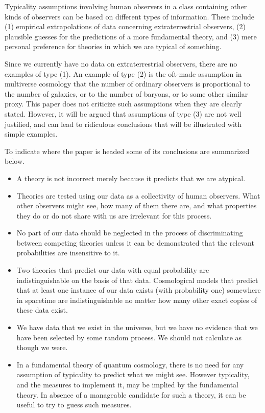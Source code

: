 \documentclass[pra,floatfix,preprint,nofootinbib,12pt]{revtex4}
\begin{document}
Typicality assumptions involving human observers in a class containing other kinds of observers can be based on different types of information.  These include
(1) empirical extrapolations of data concerning extraterrestrial observers, 
(2) plausible guesses for the predictions of a more fundamental theory, and 
(3) mere personal preference for theories in which we are typical of something. 

Since we currently have no data on extraterrestrial observers, 
there are no examples of type (1). 
An example of type (2) is the oft-made assumption in multiverse cosmology  that the number of ordinary observers is proportional to the number of galaxies, or to the number of baryons, or to some other similar proxy.  This paper does not criticize such assumptions when they are clearly stated. However, it will be argued that assumptions of type (3) are not well justified, and can lead
to ridiculous conclusions that will be illustrated with simple examples. 

To indicate where the paper
is headed some of its conclusions are summarized below.

\begin{itemize}

\item A theory is not incorrect merely because it predicts that we are atypical.

\item Theories are tested using our data as a collectivity of human observers. What other observers might see, how many of them there are, and what properties they do or do not share with us are irrelevant for this process. 

\item No part of our data should be neglected in the process of discriminating between competing theories unless it can be demonstrated that the relevant probabilities are insensitive to it. 

\item Two theories that predict our data with equal probability are indistinguishable on the basis of that data. Cosmological models that predict that at least one instance of our data exists (with probability one) somewhere in spacetime are indistinguishable no matter how many other exact copies of these data exist. 

\item We have data that we exist in the universe, but we have no evidence that we have been selected by some random process. We should not calculate as though we were.  

\item In a fundamental theory of quantum cosmology, there is no need for  any assumption of typicality to predict what we might see. However typicality, and the measures to implement it, may be implied by the fundamental theory. In absence of a manageable candidate for such a theory, it can be useful to try to guess such measures. 

\end{itemize}
\end{document}

